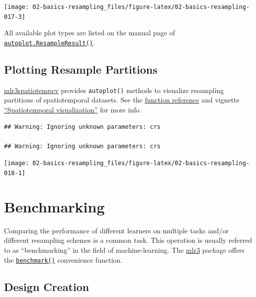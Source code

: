 \documentclass[
]{scrbook}
\begin{document}
\begin{center}\texttt{[image: 02-basics-resampling\_files/figure-latex/02-basics-resampling-017-3]} \end{center}

All available plot types are listed on the manual page of \href{https://mlr3viz.mlr-org.com/reference/autoplot.ResampleResult.html}{\texttt{autoplot.ResampleResult()}}.

\hypertarget{autoplot-resample-partition}{%
\subsection{Plotting Resample Partitions}\label{autoplot-resample-partition}}

\href{https://mlr3spatiotempcv.mlr-org.com}{mlr3spatiotempcv} provides \texttt{autoplot()} methods to visualize resampling partitions of spatiotemporal datasets.
See the \href{https://mlr3spatiotempcv.mlr-org.com/reference}{function reference} and vignette \href{https://mlr3spatiotempcv.mlr-org.com/articles/spatiotemp-viz.html}{``Spatiotemporal visualization''} for more info.

\begin{verbatim}
## Warning: Ignoring unknown parameters: crs

## Warning: Ignoring unknown parameters: crs
\end{verbatim}

\begin{center}\texttt{[image: 02-basics-resampling\_files/figure-latex/02-basics-resampling-018-1]} \end{center}

\hypertarget{benchmarking}{%
\section{Benchmarking}\label{benchmarking}}

Comparing the performance of different learners on multiple tasks and/or different resampling schemes is a common task.
This operation is usually referred to as ``benchmarking'' in the field of machine-learning.
The \href{https://mlr3.mlr-org.com}{mlr3} package offers the \href{https://mlr3.mlr-org.com/reference/benchmark.html}{\texttt{benchmark()}} convenience function.

\hypertarget{bm-design}{%
\subsection{Design Creation}\label{bm-design}}
\end{document}

